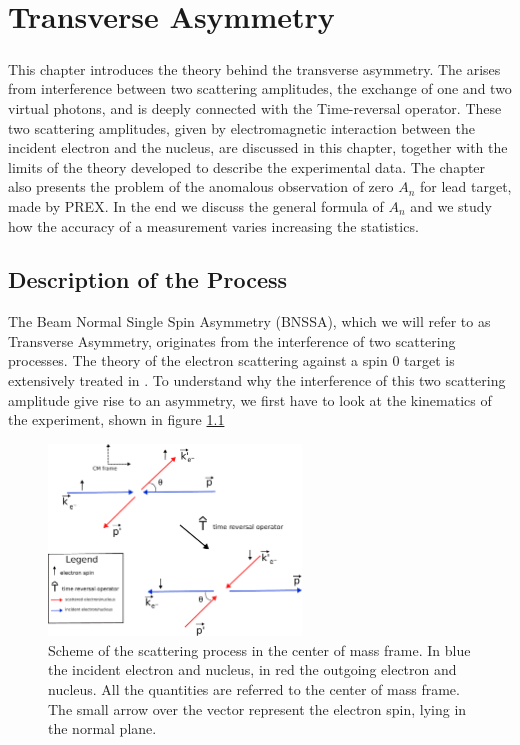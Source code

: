 
\chapter{Transverse Asymmetry} \label{transv}

\paragraph{}
This chapter introduces the theory behind the transverse asymmetry. The \transv arises from interference between two scattering amplitudes, the exchange of one and two virtual photons, and is deeply connected with the Time-reversal operator. These two scattering amplitudes, given by electromagnetic interaction between the incident electron and the nucleus, are discussed in this chapter, together with the limits of the theory developed to describe the experimental data. The chapter also presents the problem of the anomalous observation of zero $A_{n}$ for lead target, made by PREX. In the end we discuss the general formula of $A_{n}$ and we study how the accuracy of a measurement varies increasing the statistics. 

\section{Description of the Process}

The Beam Normal Single Spin Asymmetry (BNSSA), which we will refer to as Transverse Asymmetry, originates from the interference of two scattering processes. The theory of the electron scattering against a spin $0$ target is extensively treated in \cite{Gorchtein_2008}.
To understand why the interference of this two scattering amplitude give rise to an asymmetry, we first have to look at the kinematics of the experiment, shown in figure \ref{fig:ScatteringSchemeFinal}

\begin{figure}[hbtp] 
\centering
\includegraphics[width = 0.6\textwidth]{Transverse/scattering.pdf}
\caption{Scheme of the scattering process in the center of mass frame. In blue the incident electron and nucleus, in red the outgoing electron and nucleus. All the quantities are referred to the center of mass frame. The small arrow over the vector represent the electron spin, lying in the normal plane.}
\label{fig:ScatteringSchemeFinal}
\end{figure}

